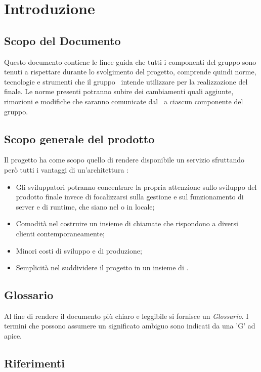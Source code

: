 \section{Introduzione}\label{Introduzione}
\subsection{Scopo del Documento}\label{ScopoDocumento}
Questo documento contiene le linee guida che tutti i componenti del gruppo sono tenuti a rispettare durante lo svolgimento del progetto, comprende quindi norme, tecnologie e strumenti che il gruppo \Gruppo\ intende utilizzare per la realizzazione del  finale. 
Le norme presenti potranno subire dei cambiamenti quali aggiunte, rimozioni e modifiche che saranno comunicate dal \Responsabile\ a ciascun componente del gruppo.

\subsection{Scopo generale del prodotto}
Il progetto {\NomeProgetto} ha come scopo quello di rendere disponibile un servizio  sfruttando però tutti i vantaggi di un'architettura :
\begin{itemize}
    \item Gli sviluppatori potranno concentrare la propria attenzione sullo sviluppo del prodotto finale invece di focalizzarsi sulla gestione e sul funzionamento di server e di runtime, che siano nel  o in locale;
    \item Comodità nel costruire un insieme di chiamate  che rispondono a diversi clienti contemporaneamente;
    \item Minori costi di sviluppo e di produzione;
    \item Semplicità nel suddividere il progetto in un insieme di .
\end{itemize}

\subsection{Glossario}\label{Glossario}
Al fine di rendere il documento più chiaro e leggibile si fornisce un \textit{Glossario}. I termini che possono assumere un significato ambiguo sono indicati da una 'G' ad apice.

\subsection{Riferimenti}

